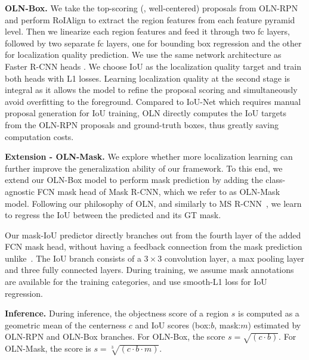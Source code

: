 \documentclass[10pt,twocolumn,letterpaper]{article}
\newcommand{\OURS}{OLN}
\renewcommand{\paragraph}[1]{\vspace{1mm}\noindent\textbf{#1}}
\begin{document}
\paragraph{OLN-Box.} \quad
We take the top-scoring (\eg, well-centered) proposals from OLN-RPN and perform RoIAlign \cite{he2017mask} to extract the region features from each feature pyramid level. Then we linearize each region features and feed it through two fc layers, followed by two separate fc layers, one for bounding box regression and the other for localization quality prediction. We use the same network architecture as Faster R-CNN heads \cite{fasterNIPS2015}. We choose IoU as the localization quality target and train both heads with L1 losses. Learning localization quality at the second stage is integral as it allows the model to refine the proposal scoring and simultaneously avoid overfitting to the foreground. Compared to IoU-Net which requires manual proposal generation for IoU training, \OURS{} directly computes the IoU targets from the OLN-RPN proposals and ground-truth boxes, thus greatly saving computation costs.


\noindent \textbf{Extension - \OURS{}-Mask.} \quad
We explore whether more localization learning can further improve the generalization ability of our framework. To this end, we extend our \OURS{}-Box model to perform mask prediction by adding the class-agnostic FCN mask head of Mask R-CNN, which we refer to as \OURS{}-Mask model. Following our philosophy of \OURS{}, and similarly to MS R-CNN~\cite{huang2019mask}, we learn to regress the IoU between the predicted and its GT mask. 

Our mask-IoU predictor directly branches out from the fourth layer of the added FCN mask head, without having a feedback connection from the mask prediction unlike~\cite{huang2019mask}. The IoU branch consists of a $3\times3$ convolution layer, a max pooling layer and three fully connected layers. During training, we assume mask annotations are available for the training categories, and use smooth-L1 loss for IoU regression.


\paragraph{Inference.}\quad 
During inference, the objectness score of a region $s$ is computed as a geometric mean of the centerness $c$ and IoU scores (box:$b$, mask:$m$) estimated by OLN-RPN and OLN-Box branches. For OLN-Box, the score $s = \sqrt{(c \cdot b)}$. For OLN-Mask, the score is $s = \sqrt[3]{(c \cdot b \cdot m)}$.
\end{document}
